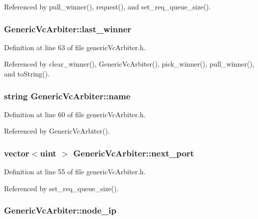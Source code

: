 Referenced by pull\_\-winner(), request(), and set\_\-req\_\-queue\_\-size().
\subsubsection[{last\_\-winner}]{ {\bf GenericVcArbiter::last\_\-winner}\hspace{0.3cm}{\tt  [private]}}\label{classGenericVcArbiter_9b5188dbe90faf50fa08d2589930124d}




Definition at line 63 of file genericVcArbiter.h.

Referenced by clear\_\-winner(), GenericVcArbiter(), pick\_\-winner(), pull\_\-winner(), and toString().
\subsubsection[{name}]{\setlength{\rightskip}{0pt plus 5cm}string {\bf GenericVcArbiter::name}\hspace{0.3cm}{\tt  [private]}}\label{classGenericVcArbiter_f2dcce4276d8321619178efac8f00aa5}




Definition at line 60 of file genericVcArbiter.h.

Referenced by GenericVcArbiter().
\subsubsection[{next\_\-port}]{\setlength{\rightskip}{0pt plus 5cm}vector$<${\bf uint} $>$ {\bf GenericVcArbiter::next\_\-port}}\label{classGenericVcArbiter_1538dd58584a6130c0846fa7da7a376d}




Definition at line 55 of file genericVcArbiter.h.

Referenced by set\_\-req\_\-queue\_\-size().
\subsubsection[{node\_\-ip}]{ {\bf GenericVcArbiter::node\_\-ip}}\label{classGenericVcArbiter_f5fe6167805ebb6bda85e58535b6f51e}




